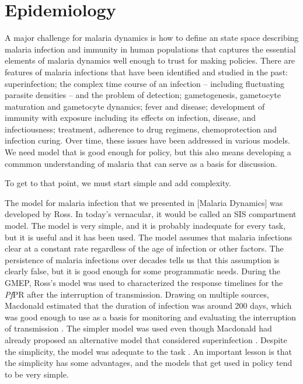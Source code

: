 \documentclass[
]{book}
\begin{document}
\section{Epidemiology}\label{epidemiology}

A major challenge for malaria dynamics is how to define an state space describing malaria infection and immunity in human populations that captures the essential elements of malaria dynamics well enough to trust for making policies.
There are features of malaria infections that have been identified and studied in the past: superinfection; the complex time course of an infection -- including fluctuating parasite densities -- and the problem of detection; gametogenesis, gametocyte maturation and gametocyte dynamics; fever and disease; development of immunity with exposure including its effects on infection, disease, and infectiousness; treatment, adherence to drug regimens, chemoprotection and infection curing. Over time, these issues have been addressed in various models.
We need model that is good enough for policy, but this also means developing a commmon understanding of malaria that can serve as a basis for discussion.

To get to that point, we must start simple and add complexity.

The model for malaria infection that we presented in {[}Malaria Dynamics{]} was developed by Ross. In today's vernacular, it would be called an SIS compartment model. The model is very simple, and it is probably inadequate for every task, but it is useful and it has been used. The model assumes that malaria infections clear at a constant rate regardless of the age of infection or other factors. The persistence of malaria infections over decades tells us that this assumption is clearly false, but it is good enough for some programmatic needs. During the GMEP, Ross's model was used to characterized the response timelines for the \emph{Pf}PR after the interruption of transmission. Drawing on multiple sources, Macdonald estimated that the duration of infection was around 200 days, which was good enough to use as a basis for monitoring and evaluating the interruption of transmission \autocite{MacdonaldG1964MalariaParasite}. The simpler model was used even though Macdonald had already proposed an alternative model that considered superinfection \autocite{MacdonaldG1950Superinfection}. Despite the simplicity, the model was adequate to the task \autocite{SmithDL2009EndemicityResponse}. An important lesson is that the simplicity has some advantages, and the models that get used in policy tend to be very simple.
\end{document}
